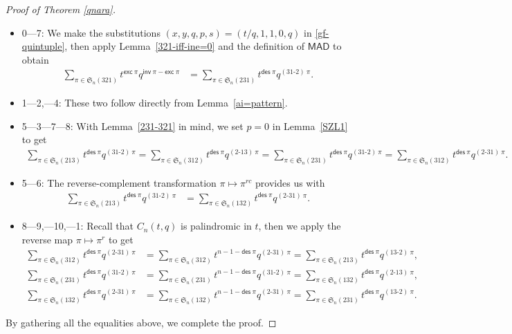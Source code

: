 \documentclass[12pt,reqno]{amsart}
\numberwithin{equation}{section}
\theoremstyle{plain}
\theoremstyle{definition}
\def\S{\mathfrak{S}}
\def\exc{\mathsf{exc}}
\def\des{\mathsf{des}}
\def\inv{\mathsf{inv}}
\def\MAD{\mathsf{MAD}}
\def\cab{31\text{-}2}
\def\bca{2\text{-}31}
\def\acb{13\text{-}2}
\def\bac{2\text{-}13}
\begin{document}
\begin{proof}[Proof of Theorem \ref{qnara}]
$\phantom{t}$
\begin{itemize}

	\item 0---7: We make the substitutions $(x,y,q,p,s)=(t/q,1,1,0,q)$
in \eqref{gf-quintuple}, then apply Lemma~\ref{321-iff-ine=0} and the definition of $\MAD$ to obtain
\begin{align*}
\sum_{\pi\in\S_n(321)}t^{\exc\:\pi}q^{\inv\:\pi-\exc\:\pi}
&=\sum_{\pi\in\S_n(231)}t^{\des\:\pi}q^{(\cab)\:\pi}.
\end{align*}
    \item 1---2,---4: These two follow directly from Lemma~\ref{ai=pattern}.
    \item 5---3---7---8:
With Lemma~\ref{231-321} in mind, we set $p=0$ in Lemma~\ref{SZL1} to get
\begin{align*}
\sum_{\pi\in\S_n(213)}t^{\des\:\pi}q^{(\cab)\:\pi}
=\sum_{\pi\in\S_n(312)}t^{\des\:\pi}q^{(\bac)\:\pi}
=\sum_{\pi\in\S_n(231)}t^{\des\:\pi}q^{(\cab)\:\pi}
=\sum_{\pi\in\S_n(312)}t^{\des\:\pi}q^{(\bca)\:\pi}.
\end{align*}
    \item 5---6: The reverse-complement transformation $\pi\mapsto\pi^{rc}$ provides us with
\begin{align*}
\sum_{\pi\in\S_n(213)}t^{\des\:\pi}q^{(\cab)\:\pi}
&=\sum_{\pi\in\S_n(132)}t^{\des\:\pi}q^{(\bca)\:\pi}.
\end{align*}
    \item 8---9,---10,---1: Recall that $C_n(t,q)$ is palindromic in $t$, then we apply the reverse map $\pi\mapsto\pi^r$ to get
\begin{align*}
\sum_{\pi\in\S_n(312)}t^{\des\:\pi}q^{(\bca)\:\pi}
&=\sum_{\pi\in\S_n(312)}t^{n-1-\des\:\pi}q^{(\bca)\:\pi}=\sum_{\pi\in\S_n(213)}t^{\des\:\pi}q^{(\acb)\:\pi},\\
\sum_{\pi\in\S_n(231)}t^{\des\:\pi}q^{(\cab)\:\pi}
&=\sum_{\pi\in\S_n(231)}t^{n-1-\des\:\pi}q^{(\cab)\:\pi}=\sum_{\pi\in\S_n(132)}t^{\des\:\pi}q^{(\bac)\:\pi},\\
\sum_{\pi\in\S_n(132)}t^{\des\:\pi}q^{(\bca)\:\pi}&=\sum_{\pi\in\S_n(132)}t^{n-1-\des\:\pi}q^{(\bca)\:\pi}=\sum_{\pi\in\S_n(231)}t^{\des\:\pi}q^{(\acb)\:\pi}.
\end{align*}
\end{itemize}
By gathering all the equalities above, we complete the proof.
\end{proof}
\end{document}
